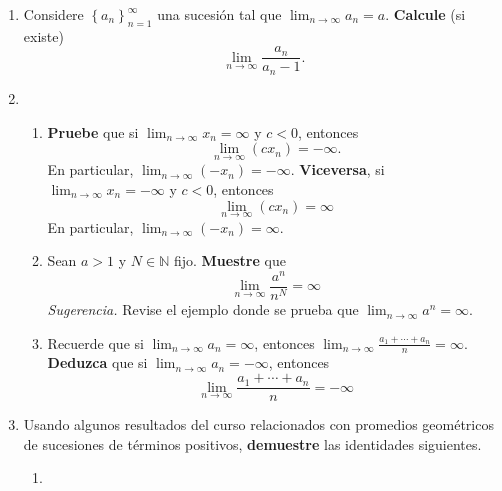\documentclass[12pt]{article}
\begin{document}
\begin{enumerate}
\begin{enumerate}
    \end{enumerate}
    \item Considere $\left\{a_n\right\}_{n=1}^{\infty}$ una sucesión tal que $\lim_{n\rightarrow\infty}a_n=a$. \textbf{Calcule} (si existe)
    \begin{equation*}
        \lim_{n\rightarrow\infty}\frac{a_n}{a_n-1}.
    \end{equation*}
    \item \begin{enumerate}
        \item \textbf{Pruebe} que si $\lim_{n\rightarrow\infty}x_n=\infty$ y $c<0$, entonces
        \begin{equation*}
            \lim_{n\rightarrow\infty}(cx_n)=-\infty.
        \end{equation*}
        En particular, $\lim_{n\rightarrow\infty}(-x_n)=-\infty$. \textbf{Viceversa}, si $\lim_{n\rightarrow\infty}x_n=-\infty$ y $c<0$, entonces
        \begin{equation*}
            \lim_{n\rightarrow\infty}(cx_n)=\infty
        \end{equation*}
        En particular, $\lim_{n\rightarrow\infty}(-x_n)=\infty$.
        \item Sean $a>1$ y $N\in\mathbb{N}$ fijo. \textbf{Muestre} que
        \begin{equation*}
            \lim_{n\rightarrow\infty}\frac{a^n}{n^N}=\infty
        \end{equation*}
        \textit{Sugerencia.} Revise el ejemplo donde se prueba que $\lim_{n\rightarrow\infty}a^n=\infty$.
        \item Recuerde que si $\lim_{n\rightarrow\infty}a_n=\infty$, entonces $\lim_{n\rightarrow\infty}\frac{a_1+\cdots+a_n}{n}=\infty$. \textbf{Deduzca} que si $\lim_{n\rightarrow\infty}a_n=-\infty$, entonces
        \begin{equation*}
            \lim_{n\rightarrow\infty}\frac{a_1+\cdots+a_n}{n}=-\infty
        \end{equation*}
    \end{enumerate}
    \item Usando algunos resultados del curso relacionados con promedios geométricos de sucesiones de términos positivos, \textbf{demuestre} las identidades siguientes.
    \begin{multicols}{2}
        \begin{enumerate}
            \item \begin{equation*}

\end{equation*}
\end{enumerate}
\end{multicols}
\end{enumerate}
\end{document}
